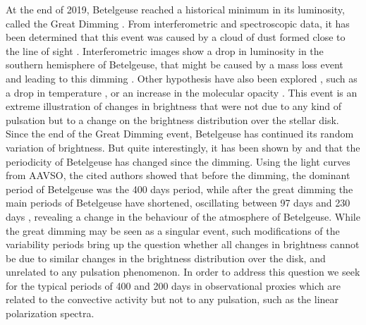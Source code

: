 \documentclass{aa}
\begin{document}
At the end of 2019, Betelgeuse reached a historical minimum in its luminosity, called the Great Dimming \citep{guinan_fall_2020}. 
From interferometric and spectroscopic data, it has been determined that this event was caused by a cloud of dust formed close to the line of 
sight \citep{montarges_dusty_2021}. 
Interferometric images show a drop in luminosity in the southern hemisphere of Betelgeuse, that might be caused by a 
mass loss event and leading to this dimming \citep{dupree_great_2022}. Other hypothesis have  also been explored , such as a drop in temperature \citep{harper_photospheric_2020}, or an increase in the molecular opacity \citep{kravchenko_atmosphere_2021}. 
This event is an extreme illustration of  changes in brightness that were not due to any kind of pulsation but to a change on the 
brightness distribution over the stellar disk.
Since the end of the Great Dimming event, Betelgeuse has continued its random variation of brightness. 
But quite interestingly, 
it has been shown by \cite{jadlovsky_analysis_2023} and \cite{dupree_great_2022} that the periodicity of Betelgeuse has changed since the dimming. Using the light curves from AAVSO, 
the cited authors showed that before the dimming, the dominant period of Betelgeuse was the 400 days period, while after the great dimming the main periods of Betelgeuse have shortened, oscillating between 97 days and 230 days \citep{dupree_great_2022}, revealing a change in the behaviour of the atmosphere of Betelgeuse.
While the great dimming may be seen as 
a singular event, such modifications of the variability periods  bring up the question whether all changes in brightness cannot be due to similar changes 
in the brightness  distribution over the disk, and unrelated to any pulsation phenomenon. 
In order to address this question we  seek for the typical periods of 400 and 200 days in  
observational proxies which are related to the convective activity but not to any pulsation, such as the linear polarization spectra.\\
\end{document}
